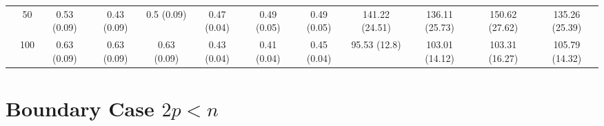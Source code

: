 \documentclass[10pt]{article}
\theoremstyle{definition}
\begin{document}
\begin{table}[H]
\begin{center}
{\begin{tabular}{cc|ccc|ccc|cccc|}
  & 50  & 0.53 (0.09) & 0.43 (0.09) & 0.5 (0.09) & 0.47 (0.04) & 0.49 (0.05) & 0.49 (0.05) & 141.22 (24.51) & 136.11 (25.73) & 150.62 (27.62) & 135.26 (25.39) \\ 
  & 100  & 0.63 (0.09) & 0.63 (0.09) & 0.63 (0.09) & 0.43 (0.04) & 0.41 (0.04) & 0.45 (0.04) & 95.53 (12.8) & 103.01 (14.12) & 103.31 (16.27) & 105.79 (14.32) \\
\end{tabular}}
   \end{center}
      \vspace{-.5cm}
\end{table}

\section{Boundary Case $2p < n$}
\end{document}
